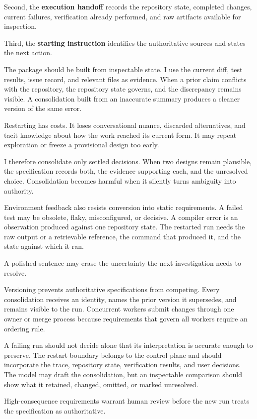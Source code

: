 Second, the \textbf{execution handoff} records the repository state, completed changes, current failures, verification already performed, and raw artifacts available for inspection.

Third, the \textbf{starting instruction} identifies the authoritative sources and states the next action.

The package should be built from inspectable state. I use the current diff, test results, issue record, and relevant files as evidence. When a prior claim conflicts with the repository, the repository state governs, and the discrepancy remains visible. A consolidation built from an inaccurate summary produces a cleaner version of the same error.

Restarting has costs. It loses conversational nuance, discarded alternatives, and tacit knowledge about how the work reached its current form. It may repeat exploration or freeze a provisional design too early.

I therefore consolidate only settled decisions. When two designs remain plausible, the specification records both, the evidence supporting each, and the unresolved choice. Consolidation becomes harmful when it silently turns ambiguity into authority.

Environment feedback also resists conversion into static requirements. A failed test may be obsolete, flaky, misconfigured, or decisive. A compiler error is an observation produced against one repository state. The restarted run needs the raw output or a retrievable reference, the command that produced it, and the state against which it ran.

A polished sentence may erase the uncertainty the next investigation needs to resolve.

Versioning prevents authoritative specifications from competing. Every consolidation receives an identity, names the prior version it supersedes, and remains visible to the run. Concurrent workers submit changes through one owner or merge process because requirements that govern all workers require an ordering rule.

A failing run should not decide alone that its interpretation is accurate enough to preserve. The restart boundary belongs to the control plane and should incorporate the trace, repository state, verification results, and user decisions. The model may draft the consolidation, but an inspectable comparison should show what it retained, changed, omitted, or marked unresolved.

High-consequence requirements warrant human review before the new run treats the specification as authoritative.

